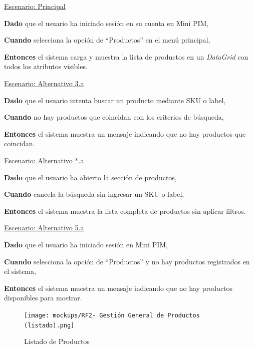 \underline{Escenario: Principal}\par
\vspace{0.15cm}
\textbf{Dado} que el usuario ha iniciado sesión en su cuenta en Mini PIM,\par
\textbf{Cuando} selecciona la opción de “Productos” en el menú principal,\par
\textbf{Entonces} el sistema carga y muestra la lista de productos en un \textit{DataGrid} con todos los atributos visibles.\par
\vspace{0.20cm}

\underline{Escenario: Alternativo 3.a}\par
\vspace{0.15cm}
\textbf{Dado} que el usuario intenta buscar un producto mediante SKU o label,\par
\textbf{Cuando} no hay productos que coincidan con los criterios de búsqueda,\par
\textbf{Entonces} el sistema muestra un mensaje indicando que no hay productos que coincidan.\par
\vspace{0.20cm}

\underline{Escenario: Alternativo *.a}\par
\vspace{0.15cm}
\textbf{Dado} que el usuario ha abierto la sección de productos,\par
\textbf{Cuando} cancela la búsqueda sin ingresar un SKU o label,\par
\textbf{Entonces} el sistema muestra la lista completa de productos sin aplicar filtros.\par
\vspace{0.20cm}

\underline{Escenario: Alternativo 5.a}\par
\vspace{0.15cm}
\textbf{Dado} que el usuario ha iniciado sesión en Mini PIM,\par
\textbf{Cuando} selecciona la opción de “Productos” y no hay productos registrados en el sistema,\par
\textbf{Entonces} el sistema muestra un mensaje indicando que no hay productos disponibles para mostrar.\par
\vspace{0.20cm}


\begin{figure}[H]
    \texttt{[image: mockups/RF2- Gestión General de Productos (listado).png]}
    \caption{Listado de Productos}
   \end{figure}
\vspace{1.0cm}

